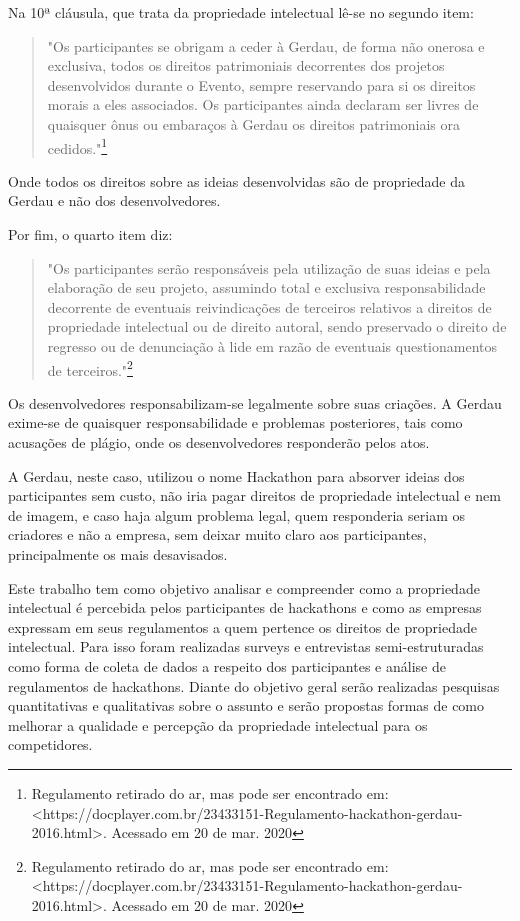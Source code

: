 Na 10ª cláusula, que trata da propriedade intelectual lê-se no segundo item:
\begin{quote}
    "Os participantes se obrigam a ceder à Gerdau, de forma não onerosa e exclusiva, todos os direitos patrimoniais decorrentes dos projetos desenvolvidos durante o Evento, sempre reservando para si os direitos morais a eles associados. Os participantes ainda declaram ser livres de quaisquer ônus ou embaraços à Gerdau os direitos patrimoniais ora cedidos."\footnote{Regulamento retirado do ar, mas pode ser encontrado em: <https://docplayer.com.br/23433151-Regulamento-hackathon-gerdau-2016.html>. Acessado em 20 de mar. 2020}
\end{quote} 
Onde todos os direitos sobre as ideias desenvolvidas são de propriedade da Gerdau e não dos desenvolvedores.

Por fim, o quarto item diz:
\begin{quote}
    "Os participantes serão responsáveis pela utilização de suas ideias e pela elaboração de seu projeto, assumindo total e exclusiva responsabilidade decorrente de eventuais reivindicações de terceiros relativos a direitos de propriedade intelectual ou de direito autoral, sendo preservado o direito de regresso ou de denunciação à lide em razão de eventuais questionamentos de terceiros."\footnote{Regulamento retirado do ar, mas pode ser encontrado em: <https://docplayer.com.br/23433151-Regulamento-hackathon-gerdau-2016.html>. Acessado em 20 de mar. 2020}
\end{quote}

Os desenvolvedores responsabilizam-se legalmente sobre suas criações. A Gerdau exime-se de quaisquer responsabilidade e problemas posteriores, tais como acusações de plágio, onde os desenvolvedores responderão pelos atos.

A Gerdau, neste caso, utilizou o nome Hackathon para absorver ideias dos participantes sem custo, não iria pagar direitos de propriedade intelectual e nem de imagem, e caso haja algum problema legal, quem responderia seriam os criadores e não a empresa, sem deixar muito claro aos participantes, principalmente os mais desavisados.

Este trabalho tem como objetivo analisar e compreender como a propriedade intelectual é percebida pelos participantes de hackathons e como as empresas expressam em seus regulamentos a quem pertence os direitos de propriedade intelectual. Para isso foram realizadas surveys e entrevistas semi-estruturadas como forma de coleta de dados a respeito dos participantes e análise de regulamentos de hackathons. Diante do objetivo geral serão realizadas pesquisas quantitativas e qualitativas sobre o assunto e serão propostas formas de como melhorar a qualidade e percepção da propriedade intelectual para os competidores.